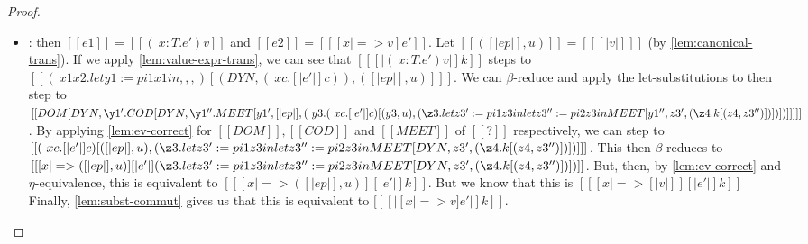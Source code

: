 \documentclass[11pt]{article}
\newcommand{\rrule}[1]{\rref*{#1}}
\begin{document}
\begin{proof}
\begin{itemize}
		\item \rrule{RedApp}: then $[[e1]] = [[ (\ x : T . e') v ]]$ and $[[e2]]=[[ [x |=> v]e' ]]$.
		Let $[[( [|ep|], u)]] = [[ [|v|] ]]$ (by \autoref{lem:canonical-trans}).
        If we apply \autoref{lem:value-expr-trans}, we can see that $[[ [|(\ x : T . e') v|]k ]]$
        steps to \\$[[ (\ x1  x2. let y1 := pi1 x1 in ,,,)[(DYN, (\ x c . [|e'|]c )), ( [|ep|], u) ]  ]]$.
        We can $\beta$-reduce and apply the let-substitutions to then step to
        \\$[[ DOM [DYN, \y1' . COD [ DYN, \y1''. MEET [y1', [|ep|], (\ y3 . (\ x c . [|e'|]c ) [(y3, u), (\z3 . let z3' := pi1 z3 in let z3'' := pi2 z3 in MEET[y1'', z3', (\z4. k[(z4, z3'')] ) ] ) ] )] ] ] ]]$.
        By applying \autoref{lem:ev-correct} for $[[DOM]], [[COD]]$ and $[[MEET]]$ of $[[?]]$ respectively,
        we can step to  
        \\$[[  (\ x c . [|e'|]c ) [([|ep|], u), (\z3 . let z3' := pi1 z3 in let z3'' := pi2 z3 in MEET[DYN, z3', (\z4. k[(z4, z3'')] ) ] ) ] ]]$.
		This then $\beta$-reduces to 
		\\$[[  [ x |=> ([|ep|], u) ][|e'|](\z3 . let z3' := pi1 z3 in let z3'' := pi2 z3 in MEET[DYN, z3', (\z4. k[(z4, z3'')] ) ] ) ]]$.
		But, then, by \autoref{lem:ev-correct} and $\eta$-equivalence, this is equivalent to
		$[[  [ x |=> ([|ep|], u) ][|e'|]k  ]]$.
		But we know that this is $[[  [ x |=> [|v|] ][|e'|]k  ]]$ 
		Finally, \autoref{lem:subst-commut} gives us that
		this is equivalent to $[[ [| [x |=> v]e' |]k  ]]$.


\end{itemize}
\end{proof}
\end{document}
